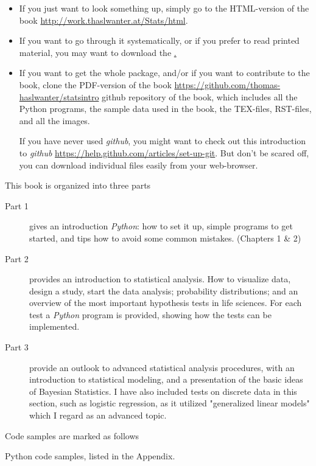 \begin{itemize}
  \item If you just want to look something up, simply go to the HTML-version of the book \url{http://work.thaslwanter.at/Stats/html}.

  \item If you want to go through it systematically, or if you prefer to read printed material, you may want to download the \href{http://work.thaslwanter.at/Stats/StatsIntro.pdf}.

  \item If you want to get the whole package, and/or if you want to contribute to the book, clone the PDF-version of the book \url{https://github.com/thomas-haslwanter/statsintro} {github repository of the book}, which  includes all the Python programs, the sample data used in the book, the TEX-files, RST-files, and all the images.

   If you have never used \emph{github}, you might want to check out this introduction to  \emph{github} \url{https://help.github.com/articles/set-up-git}. But don't be  scared off, you can download individual files easily from your
   web-browser.

\end{itemize}

This book is organized into three parts
\begin{description}
  \item[Part 1] gives an introduction \emph{Python}: how to set it up, simple programs to get started, and tips how to avoid some common mistakes. (Chapters 1 \& 2)
  \item[Part 2] provides an introduction to statistical analysis. How to visualize data, design a study, start the data analysis; probability distributions; and an overview of the most important hypothesis tests in life sciences. For each test a \emph{Python} program is provided, showing how the tests can be implemented.
  \item[Part 3] provide an outlook to advanced statistical analysis procedures, with an introduction to statistical modeling, and a presentation of the basic ideas of Bayesian Statistics. I have also included tests on discrete data in this section, such as logistic regression, as it utilized "generalized linear models" which I regard as an advanced topic.
\end{description}

Code samples are marked as follows

     Python code samples, listed in the Appendix.

